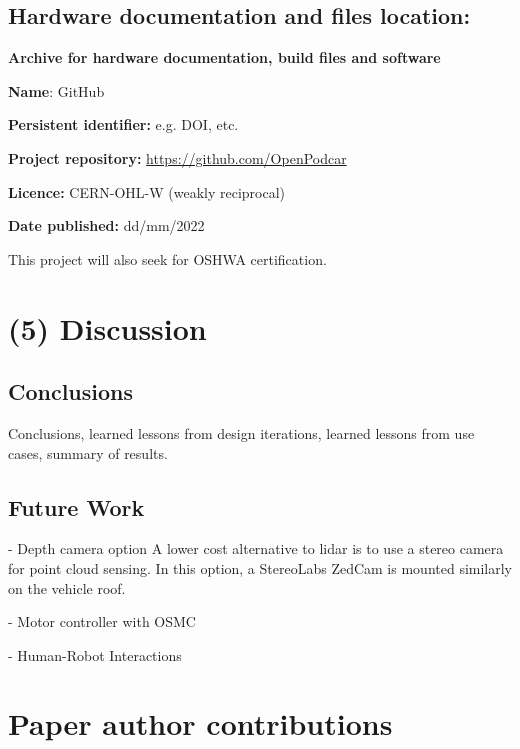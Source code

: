 \documentclass[a4paper]{article}
\begin{document}
\subsection{Hardware documentation and files location:}\label{h.nbisrsde6sc3}

\textbf{Archive for hardware documentation, build files and software}

\textbf{Name}: GitHub

\textbf{Persistent identifier:} e.g. DOI, etc.

\textbf{Project repository:} \url{https://github.com/OpenPodcar}

\textbf{Licence:} CERN-OHL-W (weakly reciprocal)

\textbf{Date published:} dd/mm/2022


This project will also seek for OSHWA certification.


\section{(5) Discussion}\label{h.90jl7wm65t65}

\subsection{Conclusions}\label{h.h3fr33ylzsnh}

Conclusions, learned lessons from design iterations, learned lessons
from use cases, summary of results.


\subsection{Future Work}\label{h.neocsr410zj}


- Depth camera option
A lower cost alternative to lidar is to use a stereo camera for point cloud sensing. In this option, a StereoLabs ZedCam is mounted similarly on the vehicle roof.

- Motor controller with OSMC

- Human-Robot Interactions


\section*{Paper author contributions}\label{h.fy8hbipy6kwe}
\end{document}
